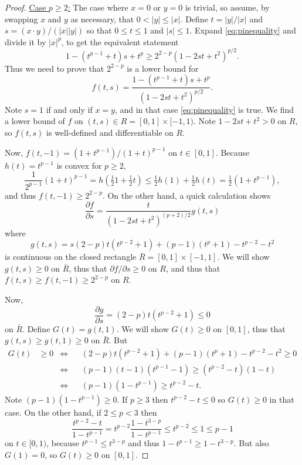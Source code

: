 \documentclass[final,leqno,onefignum,onetabnum]{siamltex1213bueler}
\begin{document}
\begin{proof}  \underline{Case $p \ge 2$:}  The case where $x=0$ or $y=0$ is trivial, so assume, by swapping $x$ and $y$ as necessary, that $0 < |y| \le |x|$.  Define $t=|y|/|x|$ and $s = (x\cdot y)/(|x||y|)$ so that $0\le t \le 1$ and $|s|\le 1$.  Expand \eqref{eq:pinequality} and divide it by $|x|^p$, to get the equivalent statement
    $$1 - (t^{p-1}+t) s + t^p \ge 2^{2-p} \left(1 - 2 s t + t^2\right)^{p/2}.$$
Thus we need to prove that $2^{2-p}$ is a lower bound for
	$$f(t,s) = \frac{1 - (t^{p-1}+t) s + t^p}{\left(1 - 2 s t + t^2\right)^{p/2}}.$$
Note $s=1$ if and only if $x=y$, and in that case \eqref{eq:pinequality} is true.  We find a lower bound of $f$ on $(t,s) \in R=[0,1]\times[-1,1)$.  Note $1-2st+t^2 > 0$ on $ R$, so $f(t,s)$ is well-defined and differentiable on $R$.

Now, $f(t,-1) = \left(1 + t^{p-1}\right) / \left(1 + t\right)^{p-1}$ on $t\in[0,1]$.  Because $h(t)=t^{p-1}$ is convex for $p \ge 2$,
    $$\frac{1}{2^{p-1}} (1+t)^{p-1} = h(\tfrac{1}{2} 1 + \tfrac{1}{2} t) \le \tfrac{1}{2} h(1) + \tfrac{1}{2} h(t) = \tfrac{1}{2} (1 + t^{p-1}),$$
and thus $f(t,-1) \ge 2^{2-p}$.  On the other hand, a quick calculation shows
    $$\frac{\partial f}{\partial s} = \frac{t}{\left(1 - 2 s t + t^2\right)^{(p+2)/2}} g(t,s)$$
where
    $$g(t,s) = s(2-p) t (t^{p-2} + 1) + (p-1) (t^p+1) - t^{p-2} - t^2$$
is continuous on the closed rectangle $\bar R = [0,1]\times[-1,1]$.  We will show $g(t,s)\ge 0$ on $\bar R$, thus that $\partial f/\partial s \ge 0$ on $R$, and thus that $f(t,s)\ge f(t,-1) \ge  2^{2-p}$ on $R$.

Now,
    $$\frac{\partial g}{\partial s} = (2-p) t (t^{p-2} + 1) \le 0$$
on $\bar R$.  Define $G(t) = g(t,1)$.  We will show $G(t)\ge 0$ on $[0,1]$, thus that $g(t,s)\ge g(t,1)\ge 0$ on $\bar R$.  But
\begin{align*}
G(t) &\ge 0 &\iff && (2-p) t (t^{p-2} + 1) + (p-1) (t^p+1) - t^{p-2} - t^2 \ge 0 \\
          & &\iff && (p-1) (t-1) (t^{p-1}-1) \ge (t^{p-2} - t) (1 - t)  \\
          & &\iff && (p-1) (1 - t^{p-1}) \ge t^{p-2} - t.
\end{align*}
Note $(p-1) (1 - t^{p-1}) \ge 0$.  If $p\ge 3$ then $t^{p-2} - t \le 0$ so $G(t)\ge 0$ in that case.  On the other hand, if $2\le p < 3$ then
	$$\frac{t^{p-2} - t}{1 - t^{p-1}} = t^{p-2} \frac{1 - t^{3-p}}{1 - t^{p-1}} \le t^{p-2} \le 1 \le p-1$$
on $t\in[0,1)$, because $t^{p-1}\le t^{3-p}$ and thus $1 - t^{p-1} \ge 1 - t^{3-p}$.  But also $G(1)=0$, so $G(t)\ge 0$ on $[0,1]$.


\end{proof}
\end{document}
